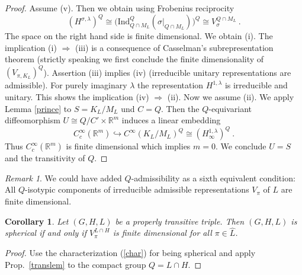 \documentclass[10]{amsart}
\newtheorem{cor}[thm]{Corollary}
\theoremstyle{remark}
\newtheorem{rem}[thm]{Remark}
\theoremstyle{definition}
\numberwithin{equation}{section}
\newcommand{\R}{\mathbb{R}}           %
\newcommand{\Ind}{\text{Ind}}
\newcommand{\be}{\begin{equation}}
\begin{document}
{\begin{proof}
Assume (v). Then we obtain using Frobenius reciprocity
%
\be\label{karl-hermann}
(H^{\sigma,\lambda})^{Q}\cong
\Big(\Ind_{Q\cap M_L}^{Q}(\sigma|_{Q\cap M_L})\Big)^Q\cong
V_\sigma^{Q\cap M_L}\ .
\end{equation}
%
The space on the right hand side is finite dimensional. We obtain (i). The implication (i) $\Rightarrow$ (iii) is a consequence of Casselman's subrepresentation theorem
(strictly speaking we first conclude the finite dimensionality of  $(V_{\pi,K_L})^Q$). Assertion (iii) implies (iv) (irreducible unitary representations are admissible). For purely imaginary $\lambda$ the representation $H^{1,\lambda}$ is irreducible and unitary.
This shows the implication  (iv) $\Rightarrow$ (ii). Now we assume (ii). We apply Lemma \ref{prince} to $S=K_L/M_L$ und $C=Q$. Then the $Q$-equivariant diffeomorphism 
$U\cong Q/C'\times \R^m$ induces a linear embedding
$$ C_c^\infty(\R^m)\hookrightarrow C^\infty(K_L/M_L)^Q\cong (H^{1,\lambda}_\infty)^Q\ .$$
Thus $C_c^\infty(\R^m)$ is finite dimensional which implies $m=0$. We conclude $U=S$ and the transitivity of $Q$.
\end{proof}

\begin{rem}
We could have added $Q$-admissibility as a sixth equivalent condition: All $Q$-isotypic components of  irreducible admissible representations $V_\pi$ of $L$ are finite dimensional.
\end{rem}
%
\begin{cor}\label{inv3} Let $(G,H,L)$ be a properly transitive triple. Then $(G,H,L)$ is spherical if and only if $V_\pi^{L\cap H}$
is finite dimensional for all $\pi\in \widehat L$.
\end{cor}
%
\begin{proof} Use the characterization (\ref{char}) for being spherical and apply Prop.~\ref{translem} to the compact group $Q=L\cap H$.
\end{proof}


}
\end{document}
